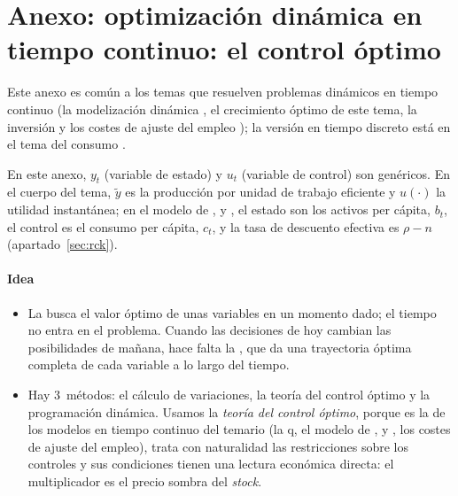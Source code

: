 \documentclass[11pt]{article}
\begin{document}
\section{Anexo: optimización dinámica en tiempo continuo:\cortetitulo{} el control óptimo}\label{anexo:control-optimo}

\begin{notaopositor}
Este anexo es común a los temas que resuelven problemas dinámicos en tiempo continuo (la modelización dinámica , el crecimiento óptimo de este tema, la inversión  y los costes de ajuste del empleo ); la versión en tiempo discreto está en el tema del consumo .
\end{notaopositor}

\begin{anotaciones}
En este anexo, $y_t$ (variable de estado) y $u_t$ (variable de control) son genéricos. En el cuerpo del tema, $\tilde y$ es la producción por unidad de trabajo eficiente y $u(\cdot)$ la utilidad instantánea; en el modelo de ,  y , el estado son los activos per cápita, $b_t$, el control es el consumo per cápita, $c_t$, y la tasa de descuento efectiva es $\rho-n$ (apartado~\ref{sec:rck}).
\end{anotaciones}


\paragraph{Idea}

\begin{itemize}
\item La  busca el valor óptimo de unas variables en un momento dado; el tiempo no entra en el problema. Cuando las decisiones de hoy cambian las posibilidades de mañana, hace falta la , que da una trayectoria óptima completa de cada variable a lo largo del tiempo.
\item Hay 3~métodos: el cálculo de variaciones, la teoría del control óptimo y la programación dinámica. Usamos la \emph{teoría del control óptimo}, porque es la de los modelos en tiempo continuo del temario (la q, el modelo de ,  y , los costes de ajuste del empleo), trata con naturalidad las restricciones sobre los controles y sus condiciones tienen una lectura económica directa: el multiplicador es el precio sombra del \emph{stock}.
\end{itemize}
\end{document}
